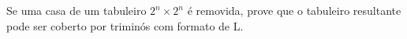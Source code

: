 Se uma casa de um tabuleiro $2^n \times 2^n$ é removida, prove que o tabuleiro resultante pode ser coberto por triminós com formato de L.